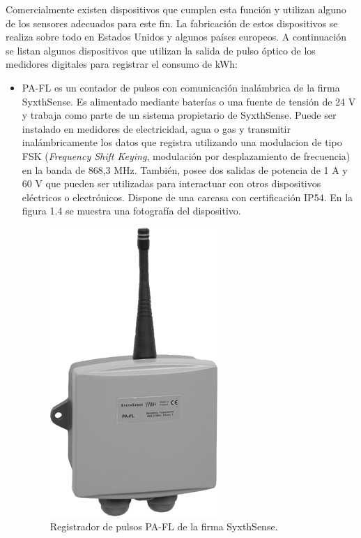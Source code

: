 Comercialmente existen dispositivos que cumplen esta función y utilizan alguno de los sensores adecuados para este fin. La fabricación de estos dispositivos se realiza sobre todo en Estados Unidos y algunos países europeos. A continuación se listan algunos dispositivos que utilizan la salida de pulso óptico de los medidores digitales para registrar el consumo de kWh:

\begin{itemize}
	\item PA-FL \citep{WEBSITE:6} es un contador de pulsos con comunicación inalámbrica de la firma SyxthSense. Es alimentado mediante baterías o una fuente de tensión de 24 V y trabaja como parte de un sistema propietario de SyxthSense. Puede ser instalado en medidores de electricidad, agua o gas y transmitir inalámbricamente los datos que registra utilizando una modulacion de tipo FSK (\textit{Frequency Shift Keying}, modulación por desplazamiento de frecuencia) en la banda de 868,3 MHz. También, posee dos salidas de potencia de 1 A y 60 V que pueden ser utilizadas para interactuar con otros dispositivos eléctricos o electrónicos. Dispone de una carcasa con certificación IP54. En la figura 1.4 se muestra una fotografía del dispositivo.
	
	\begin{figure}[h]
		\centering
		\includegraphics[scale=0.47]{./Figures/PA-FL.png}
		\caption{Registrador de pulsos PA-FL de la firma SyxthSense\protect\footnotemark.}
		\label{fig:cuadradoAzul}
	\end{figure}
	

\end{itemize}
